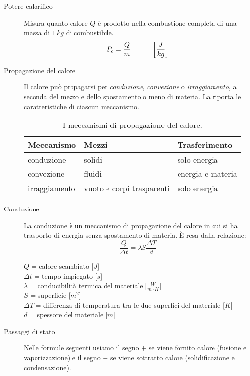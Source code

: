 \documentclass[a4paper,11pt,italian]{article}
\begin{document}
\begin{description}
  \item[Potere calorifico] 
  Misura quanto calore $ Q $ è prodotto nella combustione completa di una massa di $ 1 \, kg $ di combustibile.
  \[ P_c = \frac{Q}{m} \hspace*{3em} \left[ \frac{J}{kg} \right] \]
  
  \item[Propagazione del calore] 
  Il calore può propagarsi per \emph{conduzione}, \emph{convezione} o \emph{irraggiamento}, a seconda del mezzo e dello spostamento o meno di materia. La  riporta le caratteristiche di ciascun meccanismo.

\begin{table}[htb]\centering\footnotesize
\begin{tabular}{lll}\toprule
\textbf{Meccanismo} & \textbf{Mezzi}            & \textbf{Trasferimento}\\\midrule
conduzione          & solidi                    & solo energia\\\addlinespace[1em]
convezione          & fluidi                    & energia e materia\\\addlinespace[1em]
irraggiamento       & vuoto e corpi trasparenti & solo energia\\\bottomrule
\end{tabular}
\caption{I meccanismi di propagazione del calore.}
\label{tab:conduzione}
\end{table}


  \item[Conduzione] La conduzione è un meccanismo di propagazione del calore in cui si ha trasporto di energia senza spostamento di materia. È resa dalla relazione:
  \[ \frac{Q}{\Delta t} = \lambda S\frac{\Delta T}{d} \]
  \begin{multicols}{2}
  $ Q $ = calore scambiato [$ J $]\\
  $ \Delta t $ = tempo impiegato [$ s $]\\
  $ \lambda $ = conducibilità termica del materiale [$ \frac{W}{m \cdot K} $]\\
  $ S $ = superficie [$ m^2 $]\\
  $ \Delta T $ = differenza di temperatura tra le due superfici del materiale [$ K $]\\
  $ d $ = spessore del materiale [$ m $]
  \end{multicols}
  
  \item[Passaggi di stato] 
  Nelle formule seguenti usiamo il segno $+$ se viene fornito calore (fusione e vaporizzazione) e il segno $-$ se viene sottratto calore (solidificazione e condensazione).
  

\end{description}
\end{document}
